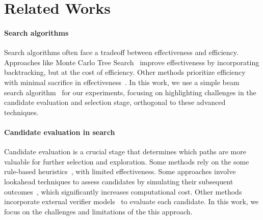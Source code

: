 \section{Related Works}
\paragraph{Search algorithms} 
Search algorithms often face a tradeoff between effectiveness and efficiency. Approaches like Monte Carlo Tree Search~\cite{RAP23,tian24} improve effectiveness by incorporating backtracking, but at the cost of efficiency. Other methods prioritize efficiency with minimal sacrifice in effectiveness~\cite{rebase24}. In this work, we use a simple beam search algorithm~\cite{OVM23,AlphaMath24} for our experiments, focusing on highlighting challenges in the candidate evaluation and selection stage, orthogonal to these advanced techniques.



\paragraph{Candidate evaluation in search} 
Candidate evaluation is a crucial stage that determines which paths are more valuable for further selection and exploration. Some methods rely on the some rule-based heuristics~\cite{deepseekprover15-24}, with limited effectiveness. Some approaches involve lookahead techniques to assess candidates by simulating their subsequent outcomes~\cite{Snell24,Wan24}, which significantly increases computational cost. Other methods incorporate external verifier models~\cite{OVM23,Snell24} to evaluate each candidate. In this work, we focus on the challenges and limitations of the this approach.

